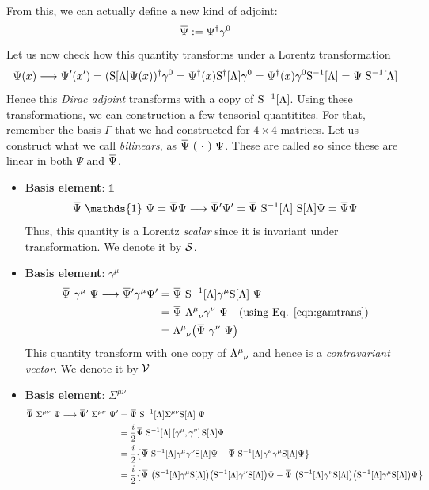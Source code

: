 From this, we can actually define a new kind of adjoint:
$$\dadj{\Psi} := \Psi^\dagger \gamma^0$$
Let us now check how this quantity transforms under a Lorentz transformation 
$$\dadj{\Psi}(x) \longrightarrow \dadj{\Psi}'(x') = (\lrep \Psi(x))^\dagger \gamma^0 = \Psi^\dagger(x)\lrepd \gamma^0= \Psi^\dagger(x) \gamma^0 \lrepinv =\dadj{\Psi} \ \lrepinv $$
Hence this \textit{Dirac adjoint} transforms with a copy of $\mathrm{S}^{-1}[\Lambda]$. Using these transformations, we can construction a few tensorial quantitites. For that, remember the basis $\Gamma$ that we had constructed for $4\times 4$ matrices. Let us construct what we call \textit{bilinears}, as $\dadj{\Psi} \ (\ \cdot\ ) \ \Psi$. These are called so since these are linear in both $\Psi$ and $\dadj{\Psi}$. 
\begin{itemize}
  \item \textbf{Basis element}: $\mathds{1}$ 
  $$\bili{\mathds{1}} = \dadj{\Psi}\Psi \longrightarrow \dadj{\Psi}'\Psi' =\dadj{\Psi}\ \lrepinv \ \lrep \Psi = \dadj{\Psi}\Psi$$
  Thus, this quantity is a Lorentz \textit{scalar} since it is invariant under transformation. We denote it by $\mathcal S$.
  \item \textbf{Basis element}: $\gamma^\mu$ 
  \begin{align*}
    \bili{\gamma^\mu} \longrightarrow \dadj{\Psi}'\gamma^\mu\Psi' &= \dadj{\Psi}\ \lrepinv \gamma^\mu \lrep \ \Psi \\
    &=\dadj{\Psi}\ \trmat{\mu}{\nu} \gamma^\nu \ \Psi \quad \text{(using Eq. \ref{eqn:gamtrans})}\\
    &=\trmat{\mu}{\nu} \qty(\dadj{\Psi}\ \gamma^\nu \ \Psi)
  \end{align*} 
  This quantity transform with one copy of $\trmat{\mu}{\nu}$ and hence is a \textit{contravariant vector}. We denote it by $\mathcal V$
  \item \textbf{Basis element}: $\Sigma^{\mu\nu}$
  \begin{align*}
    \bili{\Sigma^{\mu\nu}} \longrightarrow \dadj{\Psi}'\ \Sigma^{\mu\nu} \ \Psi' &= \dadj{\Psi}\ \lrepinv \Sigma^{\mu\nu}\lrep \ \Psi\\
    &=\frac{i}{2} \dadj{\Psi}\ \lrepinv \comtr{\gamma^\mu}{\gamma^\nu} \lrep\Psi\\
    &=\frac{i}{2}\qty{ \dadj{\Psi}\ \lrepinv {\gamma^\mu}{\gamma^\nu} \lrep\Psi - \dadj{\Psi}\ \lrepinv {\gamma^\nu}{\gamma^\mu} \lrep\Psi}\\
    &=\frac{i}{2}\qty{ \dadj{\Psi}\ \qty(\lrepinv {\gamma^\mu}\lrep)\qty(\lrepinv{\gamma^\nu} \lrep)\Psi - \dadj{\Psi}\ \qty(\lrepinv {\gamma^\nu}\lrep)\qty(\lrepinv{\gamma^\mu} \lrep)\Psi}\\

\end{align*}
\end{itemize}
